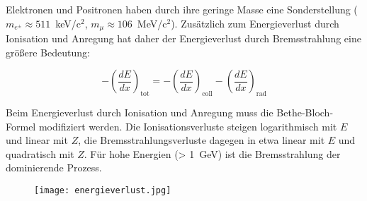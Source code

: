 Elektronen und Positronen haben durch ihre geringe Masse eine Sonderstellung ($m_{e^{\pm}} \approx
511$~keV/c$^2$, $m_{\mu} \approx 106$~MeV/c$^2$). Zusätzlich zum Energieverlust durch Ionisation und
Anregung hat daher der Energieverlust durch Bremsstrahlung eine größere Bedeutung:

\[-\left(\frac{dE}{dx}\right)_{\text{tot}} = -\left(\frac{dE}{dx}\right)_{\text{coll}}
-\left(\frac{dE}{dx}\right)_{\text{rad}} \]

Beim Energieverlust durch Ionisation und Anregung muss die Bethe-Bloch-Formel modifiziert werden.
Die Ionisationsverluste steigen logarithmisch mit $E$ und linear mit $Z$, die
Bremsstrahlungsverluste dagegen in etwa linear mit $E$ und quadratisch mit $Z$. Für hohe Energien
(> 1~GeV) ist die Bremsstrahlung der dominierende Prozess.

\begin{figure}[H]
	\centering
	\texttt{[image: energieverlust.jpg]}
	\caption{}
	\label{}
\end{figure}


